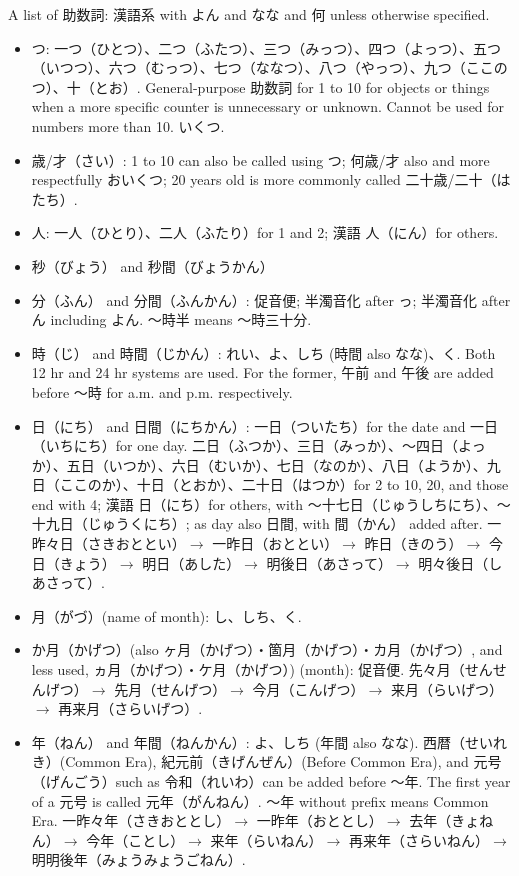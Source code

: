 \documentclass[a4paper,12pt]{article}
\begin{document}
A list of 助数詞: 漢語系 with よん and なな and 何 unless otherwise specified.
\begin{itemize}
\item つ: 一つ（ひとつ）、二つ（ふたつ）、三つ（みっつ）、四つ（よっつ）、五つ（いつつ）、六つ（むっつ）、七つ（ななつ）、八つ（やっつ）、九つ（ここのつ）、十（とお）. General-purpose 助数詞 for 1 to 10 for objects or things when a more specific counter is unnecessary or unknown. Cannot be used for numbers more than 10. いくつ.
\item 歳/才（さい）: 1 to 10 can also be called using つ; 何歳/才 also and more respectfully おいくつ; 20 years old is more commonly called 二十歳/二十（はたち）.
\item 人: 一人（ひとり）、二人（ふたり）for 1 and 2; 漢語 人（にん）for others.
\item 秒（びょう） and 秒間（びょうかん）
\item 分（ふん） and 分間（ふんかん）: 促音便; 半濁音化 after っ; 半濁音化 after ん including よん. 〜時半 means 〜時三十分.
\item 時（じ） and 時間（じかん）: れい、よ、しち (時間 also なな)、く. Both 12 hr and 24 hr systems are used. For the former, 午前 and 午後 are added before 〜時 for a.m. and p.m. respectively.
\item 日（にち） and 日間（にちかん）: 一日（ついたち）for the date and 一日（いちにち）for one day. 二日（ふつか）、三日（みっか）、〜四日（よっか）、五日（いつか）、六日（むいか）、七日（なのか）、八日（ようか）、九日（ここのか）、十日（とおか）、二十日（はつか）for 2 to 10, 20, and those end with 4; 漢語 日（にち）for others, with 〜十七日（じゅうしちにち）、〜十九日（じゅうくにち）; as day also 日間, with 間（かん） added after. 一昨々日（さきおととい）$\rightarrow$ 一昨日（おととい）$\rightarrow$ 昨日（きのう）$\rightarrow$ 今日（きょう）$\rightarrow$ 明日（あした）$\rightarrow$ 明後日（あさって）$\rightarrow$ 明々後日（しあさって）.
\item 月（がづ）(name of month): し、しち、く.
\item か月（かげつ）(also ヶ月（かげつ）・箇月（かげつ）・カ月（かげつ）, and less used, ヵ月（かげつ）・ケ月（かげつ）) (month): 促音便. 先々月（せんせんげつ）$\rightarrow$ 先月（せんげつ）$\rightarrow$ 今月（こんげつ）$\rightarrow$ 来月（らいげつ）$\rightarrow$ 再来月（さらいげつ）.
\item 年（ねん） and 年間（ねんかん）: よ、しち (年間 also なな). 西暦（せいれき）(Common Era), 紀元前（きげんぜん）(Before Common Era), and 元号（げんごう）such as 令和（れいわ）can be added before 〜年. The first year of a 元号 is called 元年（がんねん）. 〜年 without prefix means Common Era. 一昨々年（さきおととし）$\rightarrow$ 一昨年（おととし）$\rightarrow$ 去年（きょねん）$\rightarrow$ 今年（ことし）$\rightarrow$ 来年（らいねん）$\rightarrow$ 再来年（さらいねん）$\rightarrow$ 明明後年（みょうみょうごねん）.

\end{itemize}
\end{document}
